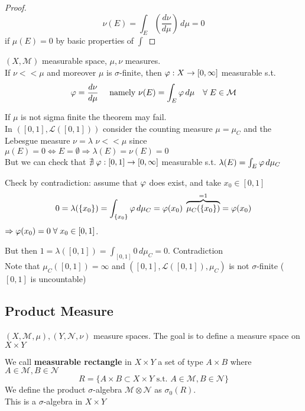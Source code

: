 \begin{proof}
    \[
        \nu(E) = \int_E \left(\frac{d\nu}{d\mu}\right) \, d\mu = 0
    \] 
    if \(\mu(E)=0\) by basic properties of \(\int\)
\end{proof}

\begin{theorem}
    \(\left(X, \mathcal{M}\right) \) measurable space, \(\mu, \nu\) measures. \\
    If \(\nu << \mu \) and moreover \(\mu \) is \(\sigma\)-finite, then \(\oldphi : X \to \left[0, \infty\right]\) measurable s.t.
    \[
        \oldphi = \frac{d \nu}{d \mu} \quad  \text{ namely } \nu(E)= \int_E \oldphi \, d\mu \quad \forall \; E \in \mathcal{M}
    \]
\end{theorem}

\begin{remark}
    If \(\mu\) is not sigma finite the theorem may fail. \\
    In \(\left(\left[0, 1\right], \mathcal{L}\left(\left[0, 1\right]\right)\right)\) consider the counting measure \(\mu = \mu_C\) and the Lebesgue measure \(\nu= \lambda\)
    \(\nu << \mu\) since \(\mu(E)= 0 \iff E= \emptyset \Rightarrow \lambda(E) = \nu(E)=0\) \\
    But we can check that \( \nexists \; \oldphi : \left[0, 1\right] \rightarrow \left[0, \infty \right]\) measurable s.t. \(\lambda(E)= \int_E \oldphi \, d\mu_C\)
\end{remark}

Check by contradiction: assume that \(\oldphi \) does exist, and take \(x_0 \in \left[0, 1\right]\)
\[ 
    0 = \lambda (\left\{x_0\right\}) = \int_{\left\{x_0\right\}} \oldphi \, d\mu_C = \oldphi (x_0) \; \overbrace{\mu_C (\left\{x_0\right\})}^{=1}= \oldphi (x_0)
\]
\(\Rightarrow \oldphi (x_0) = 0 \; \forall \; x_0 \in \left[0, 1\right]\).

But then \(1 = \lambda(\left[0, 1\right]) = \int_{\left[0, 1\right]} 0 \, d\mu_C = 0\). Contradiction \\
Note that \(\mu_C (\left[0, 1\right]) = \infty \) and \(\left( \left[0,1\right], \mathcal{L}(\left[0, 1\right]), \mu_C\right)\) is not \(\sigma\)-finite (\(\left[0,1\right]\) is uncountable)


\subsection*{Product Measure}
\( (X, \mathcal{M}, \mu), (Y, \mathcal{N}, \nu) \) measure spaces.
The goal is to define a measure space on \(X \times Y\)
\begin{definition}
    We call \textbf{measurable rectangle} in \(X \times Y\) a set of type \(A \times B\) where \(A \in \mathcal{M}, B \in \mathcal{N}\)
    \[  R = \{ A \times B \subset X\times Y \text{ s.t. } A \in \mathcal{M}, B \in \mathcal{N}\}\]
    We define the product \(\sigma\)-algebra \(\mathcal{M} \otimes \mathcal{N}\) as \(\sigma_0(R)\). \\
    This is a \(\sigma\)-algebra in \(X \times Y\)
\end{definition}

